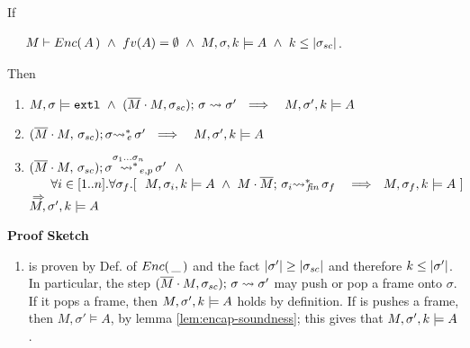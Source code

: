 {\begin{auxLemma}
\noindent
If

\noindent
 $\strut \hspace{.5cm} M \vdash \encaps A \   \wedge   \ fv(A)=\emptyset \  \wedge \ 
\satDAssertFrom M {\sigma} k A \ \wedge \ k \leq \DepthSt {\sigma\bd}$. 

\noindent
Then

\begin{enumerate}
\item
$  M, \sigma  \models \mbox{\normalfont{\texttt{extl}}} \ \wedge \  (\overline{M}\cdot M, \sigma_{sc});\, {\sigma} \rightsquigarrow \sigma' 
\ \ \Longrightarrow \ \ \ M,\sigma' ,{k} \models {A} $

\item
$   (\overline{M}\cdot M,\, {\sigma_{sc}}); \sigma{\rightsquigarrow^*}\!\!_{e}\, \sigma' 
\ \ \Longrightarrow \ \ \ M,\sigma' ,{k} \models {A} $

\item
$ \WithExtPub {\Mtwo\cdot M} {\sigma\bd}  {\sigma}  {\sigma'} {\sigma_1...\sigma_n}\ \ \wedge $\\
 $\strut \ \ \ \  \  \forall i\in [1..n]. \forall \sigma_{f}.[ \ \  \satDAssertFrom M {\sigma_i} k A  \ \wedge \  \leadstoBoundedStarFin {M\cdot \Mtwo}  {\sigma_i}  {\sigma_{f}} \ 
\ \ \Longrightarrow \ \  \satDAssertFrom M {\sigma_f} k A \ ]$\\
$\Longrightarrow $
\\
$M,\sigma' ,{k} \models {A}  $


\end{enumerate}

\end{auxLemma}

\noindent
\textbf{Proof Sketch}

\begin{enumerate}
\item
 is proven by Def. of ${Enc(\, \_\, )}$ and the fact $|\sigma'| \geq |\sigma_{sc}|$ and therefore $k\leq  |\sigma'|$.
In particular, the step $(\overline{M}\cdot M, \sigma_{sc});\, {\sigma} \rightsquigarrow \sigma'$ may push or pop a frame onto $\sigma$.
If it pops a frame, then $M,\sigma' ,{k} \models {A}  $ holds by definition.
If is pushes a frame, then $M, \sigma' \models A$, by lemma \ref{lem:encap-soundness}; this gives that $M,\sigma' ,{k} \models {A}  $.


\end{enumerate}}
